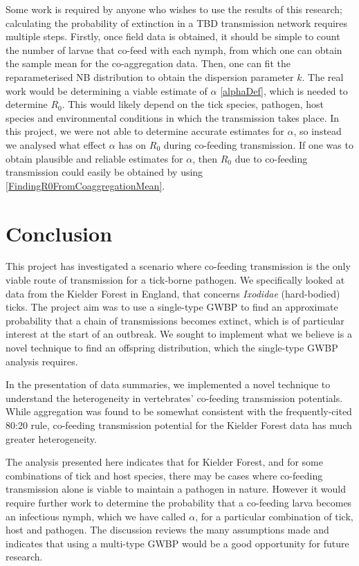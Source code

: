 \documentclass[hidelinks]{article}
\begin{document}
Some work is required by anyone who wishes to use the results of this research; calculating the probability of extinction in a TBD transmission network requires multiple steps. Firstly, once field data is obtained, it should be simple to count the number of larvae that co-feed with each nymph, from which one can obtain the sample mean for the co-aggregation data. Then, one can fit the reparameterised NB distribution to obtain the dispersion parameter $ k $. The real work would be determining a viable estimate of $ \alpha $ \eqref{alphaDef}, which is needed to determine $ R_0 $. This would likely depend on the tick species, pathogen, host species and environmental conditions in which the transmission takes place. In this project, we were not able to determine accurate estimates for $ \alpha $, so instead we analysed what effect $ \alpha $ has on $ R_0 $ during co-feeding transmission. If one was to obtain plausible and reliable estimates for $ \alpha $, then $ R_0 $ due to co-feeding transmission could easily be obtained by using \eqref{FindingR0FromCoaggregationMean}.

\newpage

\section{Conclusion}

This project has investigated a scenario where co-feeding transmission is the only viable route of transmission for a tick-borne pathogen. We specifically looked at data from the Kielder Forest in England, that concerns \textit{Ixodidae} (hard-bodied) ticks. The project aim was to use a single-type GWBP to find an approximate probability that a chain of transmissions becomes extinct, which is of particular interest at the start of an outbreak. We sought to implement what we believe is a novel technique to find an offspring distribution, which the single-type GWBP analysis requires.

In the presentation of data summaries, we implemented a novel technique to understand the heterogeneity in vertebrates' co-feeding transmission potentials. While aggregation was found to be somewhat consistent with the frequently-cited 80:20 rule, co-feeding transmission potential for the Kielder Forest data has much greater heterogeneity.

The analysis presented here indicates that for Kielder Forest, and for some combinations of tick and host species, there may be cases where co-feeding transmission alone is viable to maintain a pathogen in nature. However it would require further work to determine the probability that a co-feeding larva becomes an infectious nymph, which we have called $ \alpha $, for a particular combination of tick, host and pathogen. The discussion reviews the many assumptions made and indicates that using a multi-type GWBP would be a good opportunity for future research.
\end{document}
